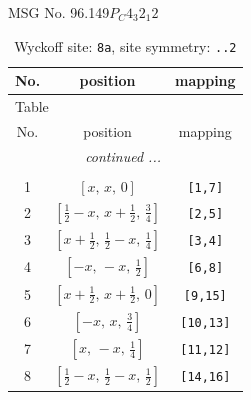 \documentclass[fleqn,8pt]{jsarticle}
\begin{document}
\setcounter{MaxMatrixCols}{32}

\renewcommand{\tablename}{Table~}
\renewcommand{\figurename}{Figure~}
\begin{center}
\LARGE
MSG No. 96.149\quad$P_{C}4_{3}2_{1}2$
\end{center}
\renewcommand{\arraystretch}{1.2}
\begin{longtable}{ccc}
\caption{Wyckoff site: {\tt 8a}, site symmetry: {\tt ..2}}
 \\
 \hline \hline
No. & position & mapping \\ \hline \endfirsthead

\multicolumn{2}{l}{\tablename\ \thetable{}} \\
 \hline \hline
No. & position & mapping \\ \hline \endhead

 \hline \hline
\multicolumn{2}{r}{\footnotesize\it continued ...} \\ \endfoot

 \hline \hline
\multicolumn{2}{r}{} \\ \endlastfoot

1 & $\left[ x,\, x,\, 0 \right]$ & {\tt [1,7]} \\ \hline
2 & $\left[ \frac{1}{2} - x,\, x + \frac{1}{2},\, \frac{3}{4} \right]$ & {\tt [2,5]} \\ \hline
3 & $\left[ x + \frac{1}{2},\, \frac{1}{2} - x,\, \frac{1}{4} \right]$ & {\tt [3,4]} \\ \hline
4 & $\left[ - x,\, - x,\, \frac{1}{2} \right]$ & {\tt [6,8]} \\ \hline
5 & $\left[ x + \frac{1}{2},\, x + \frac{1}{2},\, 0 \right]$ & {\tt [9,15]} \\ \hline
6 & $\left[ - x,\, x,\, \frac{3}{4} \right]$ & {\tt [10,13]} \\ \hline
7 & $\left[ x,\, - x,\, \frac{1}{4} \right]$ & {\tt [11,12]} \\ \hline
8 & $\left[ \frac{1}{2} - x,\, \frac{1}{2} - x,\, \frac{1}{2} \right]$ & {\tt [14,16]} \\
\end{longtable}
\renewcommand{\arraystretch}{1.2}
\end{document}
